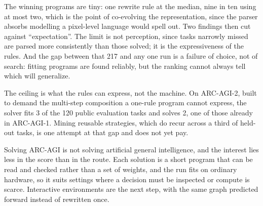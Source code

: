 The winning programs are tiny: one rewrite rule at the median, nine in ten using at most two,
which is the point of co-evolving the representation, since the parser absorbs modelling a
pixel-level language would spell out. Two findings then cut against ``expectation''. The limit
is not perception, since tasks narrowly missed are
parsed more consistently than those solved; it is the expressiveness of the rules. And the gap between that 217 and any one run is a
failure of choice, not of search: fitting programs are found reliably, but the ranking cannot
always tell which will generalize.

The ceiling is what the rules can express, not the machine. On ARC-AGI-2, built to demand the
multi-step composition a one-rule program cannot express, the solver fits 3 of the 120 public
evaluation tasks and solves 2, one of those already in ARC-AGI-1. Mining reusable strategies,
which do recur across a third of held-out tasks, is one attempt at that gap and does not yet
pay.

Solving ARC-AGI is not solving artificial general intelligence, and the interest lies less in
the score than in the route. Each solution is a short program that can be read and
checked rather than a set of weights, and the run fits on ordinary hardware, so it suits
settings where a decision must be inspected or compute is scarce.
Interactive environments are the next step, with the same graph predicted forward instead of
rewritten once.

